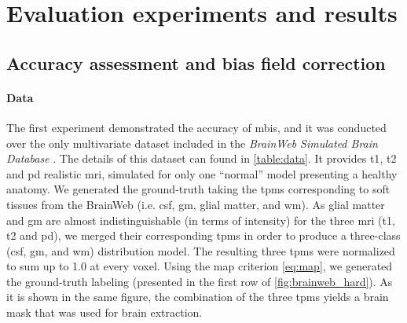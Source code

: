 \section{Evaluation experiments and results}
\label{sec:results}

\subsection{Accuracy assessment and bias field correction}
\label{sec:brainweb_evaluation}

\paragraph{Data}
The first experiment demonstrated the accuracy of \gls*{mbis}, and it was conducted
  over the only multivariate dataset included in the \emph{BrainWeb Simulated 
  Brain Database} \citep{cocosco_brainweb:_1997}.
The details of this dataset can found in \autoref{table:data}.
It provides \gls*{t1}, \gls*{t2} and \gls*{pd} realistic
  \gls*{mri}, simulated for only one ``normal'' model presenting a healthy anatomy.
We generated the ground-truth taking the \glspl*{tpm} corresponding to soft tissues
  from the BrainWeb (i.e. \gls*{csf}, \gls*{gm}, glial matter, and \gls*{wm}).
As glial matter and \gls*{gm} are almost indistinguishable (in terms of intensity)
  for the three \gls*{mri} (\gls*{t1}, \gls*{t2} and \gls*{pd}), we merged their
  corresponding \glspl*{tpm} in order to produce a three-class (\gls*{csf}, \gls*{gm},
  and \gls*{wm}) distribution model.
The resulting three \glspl*{tpm} were normalized to sum up to 1.0 at every voxel.
Using the \gls*{map} criterion \eqref{eq:map}, we generated the ground-truth labeling
  (presented in the first row of \autoref{fig:brainweb_hard}).
As it is shown in the same figure, the combination of the three \glspl*{tpm} yields a
  brain mask that was used for brain extraction.

